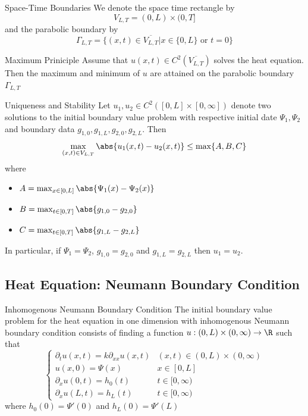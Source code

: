 \documentclass[a4paper]{article}
\begin{document}
\begin{defn}{Space-Time Boundaries}{} We denote the space time rectangle by $$V_{L,T}=(0,L)\times(0,T]$$ and the parabolic boundary by $$\Gamma_{L,T}=\{(x,t)\in\overline{V_{L,T}}|x\in\{0,L\}\text{ or }t=0\}$$
\end{defn}

\begin{thm}{Maximum Priniciple}{} Assume that $u(x,t)\in C^2(\overline{V_{L,T}})$ solves the heat equation. Then the maximum and minimum of $u$ are attained on the parabolic boundary $\Gamma_{L,T}$
\end{thm}

\begin{thm}{Uniqueness and Stability}{} Let $u_1,u_2\in C^2([0,L]\times[0,\infty])$ denote two solutions to the initial boundary value problem with respective initial date $\Psi_1,\Psi_2$ and boundary data $g_{1,0},g_{1,L},g_{2,0},g_{2,L}$. Then $$\max_{(x,t)\in V_{L,T}}\abs{u_1(x,t)-u_2(x,t)}\leq\max\{A,B,C\}$$ where 
\begin{itemize}
\item $A=\max_{x\in[0,L]}\abs{\Psi_1(x)-\Psi_2(x)}$
\item $B=\max_{t\in[0,T]}\abs{g_{1,0}-g_{2,0}}$
\item $C=\max_{t\in[0,T]}\abs{g_{1,L}-g_{2,L}}$
\end{itemize}
In particular, if $\Psi_1=\Psi_2$, $g_{1,0}=g_{2,0}$ and $g_{1,L}=g_{2,L}$ then $u_1=u_2$. 
\end{thm}

\subsection{Heat Equation: Neumann Boundary Condition}
\begin{defn}{Inhomogenous Neumann Boundary Condition}{} The initial boundary value problem for the heat equation in one dimension with inhomogenous Neumann boundary condition consists of finding a function $u:(0,L)\times(0,\infty)\to\R$ such that $$\begin{cases}
\partial_tu(x,t)=k\partial_{xx}u(x,t) & (x,t)\in(0,L)\times(0,\infty)\\
u(x,0)=\Psi(x) & x\in[0,L]\\
\partial_xu(0,t)=h_0(t) & t\in[0,\infty)\\
\partial_xu(L,t)=h_L(t) & t\in[0,\infty)
\end{cases}$$
where $h_0(0)=\Psi'(0)$ and $h_L(0)=\Psi'(L)$
\end{defn}
\end{document}
